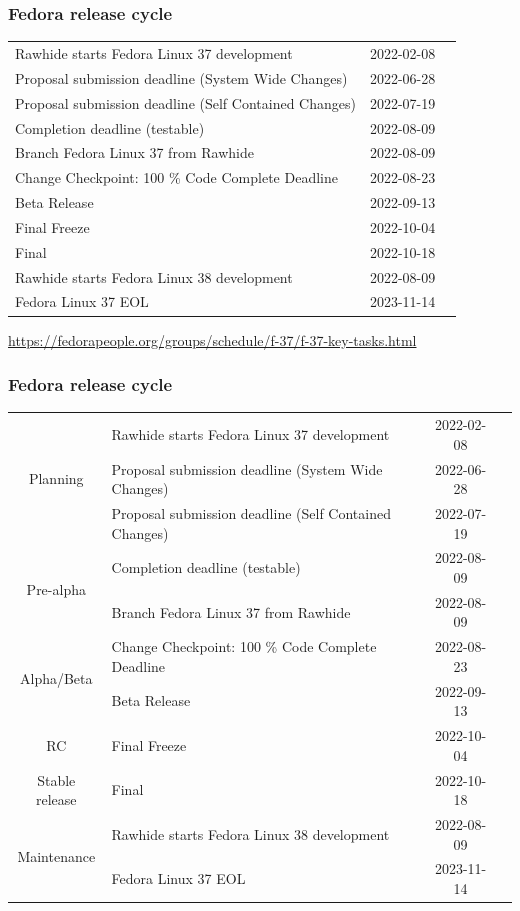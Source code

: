 \documentclass[aspectratio=169]{beamer}              %
\begin{document}
\begin{frame}
	\frametitle{Fedora release cycle}

\begin{center}
\begin{tabular}{l c c}
    Rawhide starts Fedora Linux 37 development & 2022-02-08 \\
    Proposal submission deadline (System Wide Changes) & 2022-06-28 \\
    Proposal submission deadline (Self Contained Changes) & 2022-07-19 \\
    Completion deadline (testable) & 2022-08-09  \\
    Branch Fedora Linux 37 from Rawhide & 2022-08-09 \\
    Change Checkpoint: 100 \% Code Complete Deadline & 2022-08-23  \\
    Beta Release & 2022-09-13 \\
    Final Freeze  & 2022-10-04 \\
    Final & 2022-10-18 \\
    Rawhide starts Fedora Linux 38 development  &  2022-08-09 \\
    Fedora Linux 37 EOL  & 2023-11-14 \\
\end{tabular}
\end{center}

\tiny{\url{https://fedorapeople.org/groups/schedule/f-37/f-37-key-tasks.html}}
\end{frame}

\begin{frame}
	\frametitle{Fedora release cycle}

\begin{center}
\begin{tabular}{c l c c}
  \multirow{3}{*}{\color{orange}Planning} & Rawhide starts Fedora Linux 37 development & 2022-02-08 \\
   & Proposal submission deadline (System Wide Changes) & 2022-06-28 \\
   & Proposal submission deadline (Self Contained Changes) & 2022-07-19 \\ \hline
  \multirow{2}{*}{\color{orange}Pre-alpha}   & Completion deadline (testable) & 2022-08-09  \\
   & Branch Fedora Linux 37 from Rawhide & 2022-08-09 \\ \hline
   \multirow{2}{*}{\color{orange}Alpha/Beta}  & Change Checkpoint: 100 \% Code Complete Deadline & 2022-08-23  \\
   & Beta Release & 2022-09-13 \\ \hline
  \color{orange}RC  & Final Freeze  & 2022-10-04 \\ \hline
  \color{orange}Stable release & Final & 2022-10-18 \\ \hline
  \multirow{2}{*}{\color{orange}Maintenance}  & Rawhide starts Fedora Linux 38 development  &  2022-08-09 \\
   & Fedora Linux 37 EOL  & 2023-11-14 \\
\end{tabular}
\end{center}
\end{frame}
\end{document}

